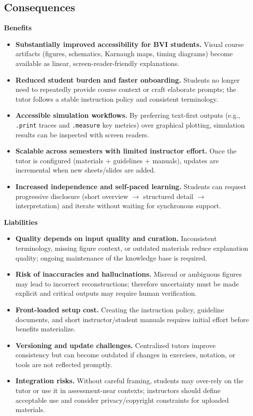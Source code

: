 \subsection*{Consequences}

\noindent\textbf{Benefits}
\begin{itemize}
    \item[$+$] \textbf{Substantially improved accessibility for BVI students.} Visual course artifacts (figures, schematics, Karnaugh maps, timing diagrams) become available as linear, screen-reader-friendly explanations.
    \item[$+$] \textbf{Reduced student burden and faster onboarding.} Students no longer need to repeatedly provide course context or craft elaborate prompts; the tutor follows a stable instruction policy and consistent terminology.
    \item[$+$] \textbf{Accessible simulation workflows.} By preferring text-first outputs (e.g., \texttt{.print} traces and \texttt{.measure} key metrics) over graphical plotting, simulation results can be inspected with screen readers.
    \item[$+$] \textbf{Scalable across semesters with limited instructor effort.} Once the tutor is configured (materials + guidelines + manuals), updates are incremental when new sheets/slides are added.
    \item[$+$] \textbf{Increased independence and self-paced learning.} Students can request progressive disclosure (short overview $\rightarrow$ structured detail $\rightarrow$ interpretation) and iterate without waiting for synchronous support.
\end{itemize}

\noindent\textbf{Liabilities}
\begin{itemize}
    \item[$-$] \textbf{Quality depends on input quality and curation.} Inconsistent terminology, missing figure context, or outdated materials reduce explanation quality; ongoing maintenance of the knowledge base is required.
    \item[$-$] \textbf{Risk of inaccuracies and hallucinations.} Misread or ambiguous figures may lead to incorrect reconstructions; therefore uncertainty must be made explicit and critical outputs may require human verification.
    \item[$-$] \textbf{Front-loaded setup cost.} Creating the instruction policy, guideline documents, and short instructor/student manuals requires initial effort before benefits materialize.
    \item[$-$] \textbf{Versioning and update challenges.} Centralized tutors improve consistency but can become outdated if changes in exercises, notation, or tools are not reflected promptly.
    \item[$-$] \textbf{Integration risks.} Without careful framing, students may over-rely on the tutor or use it in assessment-near contexts; instructors should define acceptable use and consider privacy/copyright constraints for uploaded materials.
\end{itemize}

